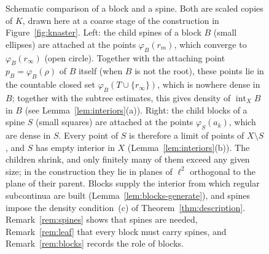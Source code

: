 \documentclass[11pt]{amsart}
\theoremstyle{definition}
\theoremstyle{remark}
\newcommand{\intX}{\operatorname{int}_X}
\begin{document}
\begin{figure}[ht]
\caption{Schematic comparison of a block and a spine. Both are scaled copies of $K$, drawn here at a coarse stage of the construction in Figure~\ref{fig:knaster}. Left: the child spines of a block $B$ (small ellipses) are attached at the points $\varphi_B(r_m)$, which converge to $\varphi_B(r_\infty)$ (open circle). Together with the attaching point $p_B=\varphi_B(\rho)$ of $B$ itself (when $B$ is not the root), these points lie in the countable closed set $\varphi_B(T\cup\{r_\infty\})$, which is nowhere dense in $B$; together with the subtree estimates, this gives density of $\intX B$ in $B$ (see Lemma~\ref{lem:interiors}(a)). Right: the child blocks of a spine $S$ (small squares) are attached at the points $\varphi_S(a_k)$, which are dense in $S$. Every point of $S$ is therefore a limit of points of $X\setminus S$, and $S$ has empty interior in $X$ (Lemma~\ref{lem:interiors}(b)). The children shrink, and only finitely many of them exceed any given size; in the construction they lie in planes of $\ell^2$ orthogonal to the plane of their parent. Blocks supply the interior from which regular subcontinua are built (Lemma~\ref{lem:blocks-generate}), and spines impose the density condition~(c) of Theorem~\ref{thm:description}. Remark~\ref{rem:spines} shows that spines are needed, Remark~\ref{rem:leaf} that every block must carry spines, and Remark~\ref{rem:blocks} records the role of blocks.}
\label{fig:block-spine}
\end{figure}
\end{document}
